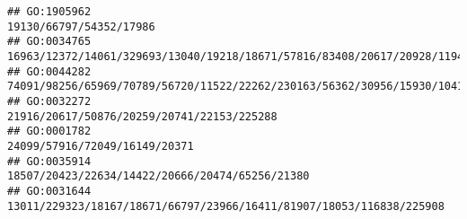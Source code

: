 \documentclass[
]{article}
\begin{document}
\begin{verbatim}
## GO:1905962                                                                                                                                                                                                                                                                                                                                                                                      19130/66797/54352/17986
## GO:0034765                                                                                                                                                                                                                                                                                           16963/12372/14061/329693/13040/19218/18671/57816/83408/20617/20928/11944/12478/81897/14169/14419/12482/14126/12766
## GO:0044282                                                                                                                                                                                                                                                                                       74091/98256/65969/70789/56720/11522/22262/230163/56362/30956/15930/104158/244757/434437/22271/18126/11720/67464/631304
## GO:0032272                                                                                                                                                                                                                                                                                                                                                                   21916/20617/50876/20259/20741/22153/225288
## GO:0001782                                                                                                                                                                                                                                                                                                                                                                                24099/57916/72049/16149/20371
## GO:0035914                                                                                                                                                                                                                                                                                                                                                              18507/20423/22634/14422/20666/20474/65256/21380
## GO:0031644                                                                                                                                                                                                                                                                                                                                         13011/229323/18167/18671/66797/23966/16411/81907/18053/116838/225908

\end{verbatim}
\end{document}

